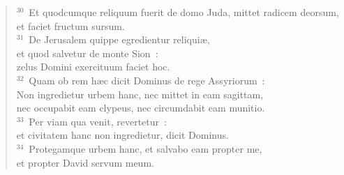 \begin{flushleft}
\begin{verse}
${}^{30}$~Et quodcumque reliquum fuerit de domo Juda, mittet radicem deorsum,\\ et faciet fructum sursum.\\
${}^{31}$~De Jerusalem quippe egredientur reliqui\ae ,\\ et quod salvetur de monte Sion~:\\ zelus Domini exercituum faciet hoc.\\
${}^{32}$~Quam ob rem h\ae c dicit Dominus de rege Assyriorum~:\\ Non ingredietur urbem hanc, nec mittet in eam sagittam,\\ nec occupabit eam clypeus, nec circumdabit eam munitio.\\
${}^{33}$~Per viam qua venit, revertetur~:\\ et civitatem hanc non ingredietur, dicit Dominus.\\
${}^{34}$~Protegamque urbem hanc, et salvabo eam propter me,\\ et propter David servum meum.\end{verse}\end{flushleft}


